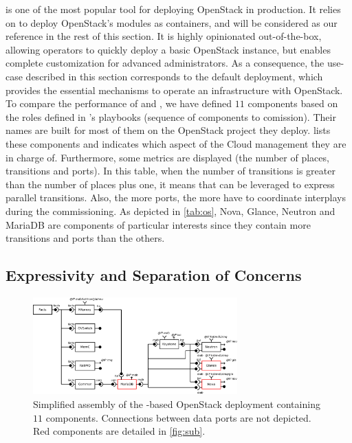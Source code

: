 \kolla is one of the most popular tool for deploying OpenStack in
production.  It relies on \ansible to deploy OpenStack's modules as
\docker containers, and will be considered as our reference in the
rest of this section. It is highly opinionated out-of-the-box,
allowing operators to quickly deploy a basic OpenStack instance, but
enables complete customization for advanced administrators. As a
consequence, the use-case described in this section corresponds to the
default \kolla deployment, which provides the essential mechanisms to
operate an infrastructure with OpenStack.
%
To compare the performance of \kolla and \mad, we have defined $11$
\mad components based on the \ansible roles defined in \kolla's
playbooks (\ie \ansible sequence of components to comission). Their
names are built for most of them on the OpenStack project they deploy.
 lists these components and indicates which aspect of the
Cloud management they are in charge of. Furthermore, some \mad metrics
are displayed (\ie the number of places, transitions and ports).
%
In this table, when the number of transitions is greater than the
number of places plus one, it means that \mad can be leveraged to
express parallel transitions. Also, the more ports, the more \mad have
to coordinate interplays during the commissioning. As depicted in
\cref{tab:os}, Nova, Glance, Neutron and MariaDB are components of
particular interests since they contain more transitions and ports
than the others.

\subsection{Expressivity and Separation of Concerns}

\begin{figure}
  \begin{center}
    \includegraphics[width=0.7\textwidth]{./images/full.pdf}
    \caption{Simplified \mad assembly of the \kolla-based OpenStack deployment
    containing $11$ components. Connections between data ports are not depicted.
    Red components are detailed in \cref{fig:sub}.}
    \label{fig:full}
  \end{center}
\end{figure}

